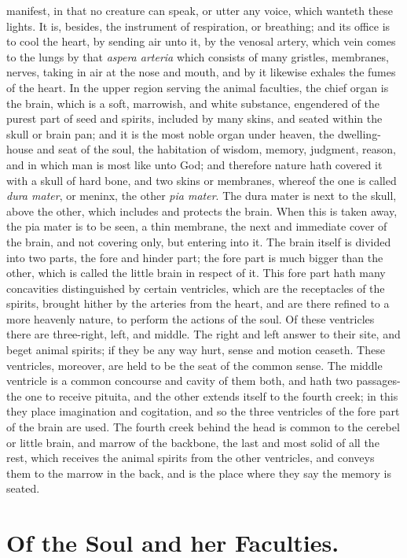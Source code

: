 {manifest, in that no creature can speak, or utter any voice, which
wanteth these lights. It is, besides, the instrument of respiration, or
breathing; and its office is to cool the heart, by sending air unto it,
by the venosal artery, which vein comes to the lungs by that \emph{aspera
arteria} which consists of many gristles, membranes, nerves, taking in
air at the nose and mouth, and by it likewise exhales the fumes of the
heart.
In the upper region serving the animal faculties, the chief organ is
the brain, which is a soft, marrowish, and white substance, engendered
of the purest part of seed and spirits, included by many skins, and
seated within the skull or brain pan; and it is the most noble organ
under heaven, the dwelling-house and seat of the soul, the habitation
of wisdom, memory, judgment, reason, and in which man is most like unto
God; and therefore nature hath covered it with a skull of hard bone,
and two skins or membranes, whereof the one is called \emph{dura mater}, or
meninx, the other \emph{pia mater}. The dura mater is next to the skull,
above the other, which includes and protects the brain. When this is
taken away, the pia mater is to be seen, a thin membrane, the next and
immediate cover of the brain, and not covering only, but entering into
it. The brain itself is divided into two parts, the fore and hinder
part; the fore part is much bigger than the other, which is called the
little brain in respect of it. This fore part hath many concavities
distinguished by certain ventricles, which are the receptacles of the
spirits, brought hither by the arteries from the heart, and are there
refined to a more heavenly nature, to perform the actions of the soul.
Of these ventricles there are three-right, left, and middle. The right
and left answer to their site, and beget animal spirits; if they be any
way hurt, sense and motion ceaseth. These ventricles, moreover, are
held to be the seat of the common sense. The middle ventricle is a
common concourse and cavity of them both, and hath two passages-the one
to receive pituita, and the other extends itself to the fourth creek;
in this they place imagination and cogitation, and so the three
ventricles of the fore part of the brain are used. The fourth creek
behind the head is common to the cerebel or little brain, and marrow of
the backbone, the last and most solid of all the rest, which receives
the animal spirits from the other ventricles, and conveys them to the
marrow in the back, and is the place where they say the memory is
seated.

\section{Of the Soul and her Faculties.}

}
